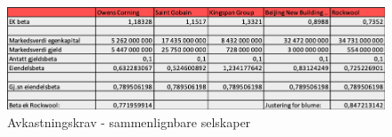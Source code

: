 \begin{figure}[H]
\centering
\includegraphics [scale=0.9]{appendiks/bilder/avkastningskrav.png}
\caption{Avkastningskrav - sammenlignbare selskaper \cite{yahoo}}
\label{fig:avkastningskrav}
\end{figure}